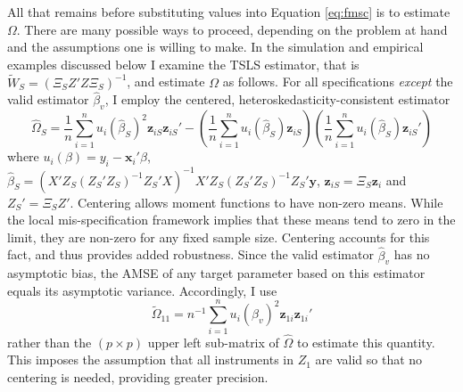 All that remains before substituting values into Equation \ref{eq:fmsc} is to estimate $\Omega$. 
There are many possible ways to proceed, depending on the problem at hand and the assumptions one is willing to make. 
In the simulation and empirical examples discussed below I examine the TSLS estimator, that is $\widetilde{W}_S = (\Xi_S Z'Z\Xi_S)^{-1}$, and estimate $\Omega$ as follows. 
For all specifications \emph{except} the valid estimator $\widehat{\beta}_v$, I employ the centered, heteroskedasticity-consistent estimator
\begin{equation}
	\widehat{\Omega}_S = \frac{1}{n}\sum_{i=1}^n u_i(\widehat{\beta}_S)^2\mathbf{z}_{iS} \mathbf{z}_{iS}'  - \left(\frac{1}{n}\sum_{i=1}^n u_i(\widehat{\beta}_S)\mathbf{z}_{iS}   \right)\left(\frac{1}{n}\sum_{i=1}^n  u_i(\widehat{\beta}_S)\mathbf{z}_{iS}'  \right)
\end{equation}
where $u_i(\beta) = y_i - \mathbf{x}_i'\beta$, $\widehat{\beta}_S = (X'Z_S(Z_S'Z_S)^{-1}Z_S'X)^{-1}X'Z_S(Z_S'Z_S)^{-1}Z_S'\mathbf{y}$, $\mathbf{z}_{iS} = \Xi_S \mathbf{z}_i$ and $Z_S' = \Xi_S Z'$.
Centering allows moment functions to have non-zero means. 
While the local mis-specification framework implies that these means tend to zero in the limit, they are non-zero for any fixed sample size. 
Centering accounts for this fact, and thus provides added robustness. 
Since the valid estimator $\widehat{\beta}_v$ has no asymptotic bias, the AMSE of any target parameter based on this estimator equals its asymptotic variance. 
Accordingly, I use 
\begin{equation}
	\widetilde{\Omega}_{11}= n^{-1}\sum_{i=1}^n u_i(\widehat{\beta}_v)^2\mathbf{z}_{1i}\mathbf{z}_{1i}'
\end{equation}
rather than the $(p\times p)$ upper left sub-matrix of $\widehat{\Omega}$ to estimate this quantity. 
This imposes the assumption that all instruments in $Z_1$ are valid so that no centering is needed, providing greater precision.